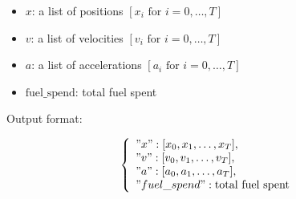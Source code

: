 \documentclass{article}
\begin{document}
\begin{itemize}
    \item \( x \): a list of positions \( [x_i \text{ for } i = 0, \ldots, T] \)
    \item \( v \): a list of velocities \( [v_i \text{ for } i = 0, \ldots, T] \)
    \item \( a \): a list of accelerations \( [a_i \text{ for } i = 0, \ldots, T] \)
    \item \( \text{fuel\_spend} \): total fuel spent
\end{itemize}

Output format:

\[
\left\{
\begin{array}{l}
"x": [x_0, x_1, \ldots, x_T], \\
"v": [v_0, v_1, \ldots, v_T], \\
"a": [a_0, a_1, \ldots, a_T], \\
"fuel\_spend": \text{total fuel spent}
\end{array}
\right.
\]
\end{document}
